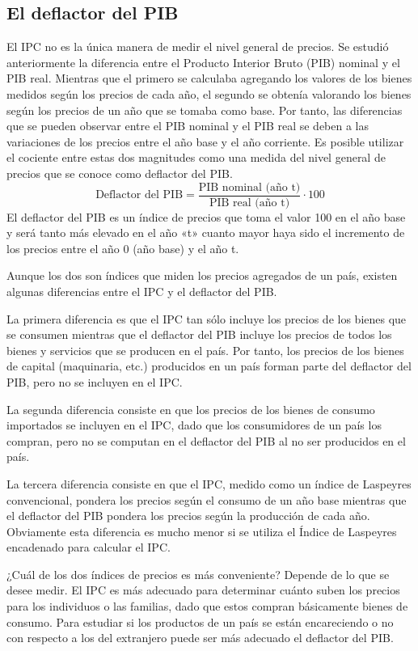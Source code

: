 \documentclass[
]{krantz}
\begin{document}
\hypertarget{el-deflactor-del-pib}{%
\subsection{El deflactor del PIB}\label{el-deflactor-del-pib}}

El IPC no es la única manera de medir el nivel general de precios. Se estudió anteriormente la diferencia entre el Producto Interior Bruto (PIB) nominal y el PIB real. Mientras que el primero se calculaba agregando los valores de los bienes medidos según los precios de cada año, el segundo se obtenía valorando los bienes según los precios de un año que se tomaba como base. Por tanto, las diferencias que se pueden observar entre el PIB nominal y el PIB real se deben a las variaciones de los precios entre el año base y el año corriente. Es posible utilizar el cociente entre estas dos magnitudes como una medida del nivel general de precios que se conoce como deflactor del PIB.
\[\mathrm {\text{Deflactor del PIB} = \frac{\text{PIB nominal (año t)}}{\text{PIB real (año t)}}·100}\]
El deflactor del PIB es un índice de precios que toma el valor 100 en el año base y será tanto más elevado en el año «t» cuanto mayor haya sido el incremento de los precios entre el año 0 (año base) y el año t.

Aunque los dos son índices que miden los precios agregados de un país, existen algunas diferencias entre el IPC y el deflactor del PIB.

La primera diferencia es que el IPC tan sólo incluye los precios de los bienes que se consumen mientras que el deflactor del PIB incluye los precios de todos los bienes y servicios que se producen en el país. Por tanto, los precios de los bienes de capital (maquinaria, etc.) producidos en un país forman parte del deflactor del PIB, pero no se incluyen en el IPC.

La segunda diferencia consiste en que los precios de los bienes de consumo importados se incluyen en el IPC, dado que los consumidores de un país los compran, pero no se computan en el deflactor del PIB al no ser producidos en el país.

La tercera diferencia consiste en que el IPC, medido como un índice de Laspeyres convencional, pondera los precios según el consumo de un año base mientras que el deflactor del PIB pondera los precios según la producción de cada año. Obviamente esta diferencia es mucho menor si se utiliza el Índice de Laspeyres encadenado para calcular el IPC.

¿Cuál de los dos índices de precios es más conveniente? Depende de lo que se desee medir. El IPC es más adecuado para determinar cuánto suben los precios para los individuos o las familias, dado que estos compran básicamente bienes de consumo. Para estudiar si los productos de un país se están encareciendo o no con respecto a los del extranjero puede ser más adecuado el deflactor del PIB.
\end{document}
